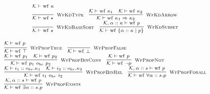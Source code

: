 \documentclass[fleqn]{article}
\begin{document}
\[
\scriptsize
\begin{array}{l}
    \mathcal{K} \vdash \mathrm{wf}~\kappa \\
    \infer[\textsc{WfKdType}]{\mathcal{K} \vdash \mathrm{wf}~\star}{} \hspace{1em}
    \infer[\textsc{WfKdArrow}]{\mathcal{K} \vdash \mathrm{wf}~\kappa_1 \Rightarrow \kappa_2}{\mathcal{K} \vdash \mathrm{wf}~\kappa_1 & \mathcal{K} \vdash \mathrm{wf}~\kappa_2} \\
    \infer[\textsc{WfKdBaseSort}]{\mathcal{K} \vdash \mathrm{wf}~s}{} \hspace{1em}
    \infer[\textsc{WfKdSubset}]{\mathcal{K} \vdash \mathrm{wf}~\{ \alpha :: \kappa \mid p \}}{\mathcal{K},\alpha :: \kappa \vdash \mathrm{wf}~p}
\end{array}
\]

\[
\scriptsize
\begin{array}{l}
    \mathcal{K} \vdash \mathrm{wf}~p \\
    \infer[\textsc{WfPropTrue}]{\mathcal{K} \vdash \mathrm{wf}~\top}{} \hspace{1em}
    \infer[\textsc{WfPropFalse}]{\mathcal{K} \vdash \mathrm{wf}~\bot}{} \\
    \infer[\textsc{WfPropBinConn}]{\mathcal{K} \vdash \mathrm{wf}~p_1~o_{bc}~p_2}{\mathcal{K} \vdash \mathrm{wf}~p_1 & \mathcal{K} \vdash \mathrm{wf}~p_2} \hspace{1em}
    \infer[\textsc{WfPropNot}]{\mathcal{K} \vdash \mathrm{wf}~\neg p}{\mathcal{K} \vdash \mathrm{wf}~p} \hspace{1em} \\
    \infer[\textsc{WfPropBinRel}]{\mathcal{K} \vdash \mathrm{wf}~i_1~o_{br}~i_2}{\mathcal{K} \vdash i_1 :: o_{br}.\kappa_1 & \mathcal{K} \vdash i_2 :: o_{br}.\kappa_2} \hspace{1em}
    \infer[\textsc{WfPropForall}]{\mathcal{K} \vdash \mathrm{wf}~\forall \alpha :: s. p}{\mathcal{K},\alpha :: s \vdash \mathrm{wf}~p} \\
    \infer[\textsc{WfPropExists}]{\mathcal{K} \vdash \mathrm{wf}~\exists \alpha :: s. p}{\mathcal{K},\alpha :: s \vdash \mathrm{wf}~p}
\end{array}
\]
\end{document}
